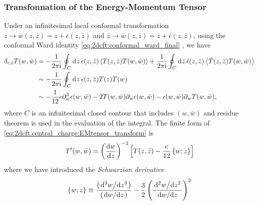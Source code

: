 \documentclass[10pt]{article}
\newcommand{\ii}{\mathrm{i}}
\begin{document}
\subsubsection{Transfonnation of the Energy-Momentum Tensor}
Under an infinitesimal local conformal transformation $z\to w(z,\bar{z})=z+\epsilon(z,\bar{z})$ and $\bar{z}\to \bar{w}(z,\bar{z})=\bar{z}+\bar{\epsilon}(z,\bar{z})$, using the conformal Ward identity \cref{eq:2dcft:conformal_ward_final} , we have%
\begin{align}
    \delta_{\epsilon,\bar{\epsilon}} T(w,\bar{w}) & =-\frac{1}{2\pi\ii}\oint_C\dd[]{z}\epsilon(z,\bar{z})\expval{T(z,\bar{z})T(w,\bar{w})}+\frac{1}{2\pi\ii}\oint_C\dd[]{\bar{z}}\bar{\epsilon}(z,\bar{z})\expval{\bar{T}(z,\bar{z})T(w,\bar{w})}\notag \\
                                                  & \sim-\frac{1}{2\pi\ii}\oint_C\dd[]{z}\epsilon(z,\bar{z})T(z)T(w)\notag                                                                                                                              \\
                                                  & \sim-\frac{1}{12}c\partial^3_w\epsilon(w,\bar{w})-2T(w,\bar{w})\partial_w\epsilon(w,\bar{w})-\epsilon(w,\bar{w})\partial_w T(w,\bar{w}),\label{eq:2dcft:central_charge:EMtensor_transform}
\end{align}
where $C$ is an infinitesimal closed contour that includes $(w,\bar{w})$ and residue theorem is used in the evaluation of the integral.
The finite form of \cref{eq:2dcft:central_charge:EMtensor_transform} is%
\begin{align}
    T'(w,\bar{w})=\left(\dv{w}{z}\right)^{-2}\left[T(z,\bar{z})-\frac{c}{12}\left\{w;z\right\}\right]\label{eq:2dcft:c:transformation_T}
\end{align}
where we have introduced the \textit{Schwarzian derivative}
\begin{align}
    \left\{w;z\right\}\equiv\frac{\left(\dv*[3]{w}{z}\right)}{\left(\dv*{w}{z}\right)}-\frac{3}{2}\left(\frac{\dv*[2]{w}{z}}{\dv*{w}{z}}\right)^2
\end{align}
\end{document}
